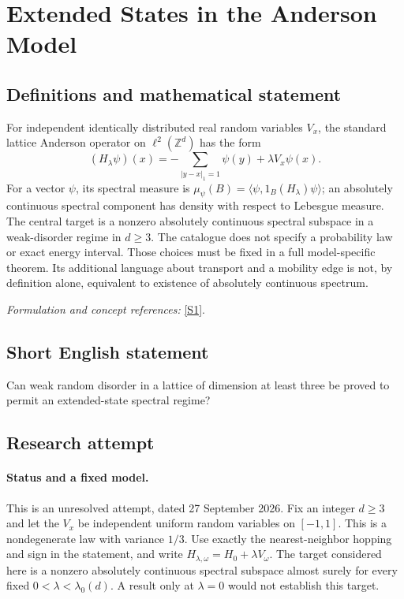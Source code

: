 \documentclass[11pt]{article}
\begin{document}
\section*{\texorpdfstring{Extended States in the Anderson Model}{Extended States in the Anderson Model}}\label{7900001}
\subsection{Definitions and mathematical statement}
For independent identically distributed real random variables $V_x$, the standard lattice Anderson operator on $\ell^2({\mathbb{Z}}^d)$ has the form
\[
 (H_\lambda\psi)(x)=-\sum_{|y-x|_1=1}\psi(y)+\lambda V_x\psi(x).
\]
For a vector $\psi$, its spectral measure is $\mu_\psi(B)=\langle\psi,1_B(H_\lambda)\psi\rangle$; an absolutely continuous spectral component has density with respect to Lebesgue measure. The central target is a nonzero absolutely continuous spectral subspace in a weak-disorder regime in $d\ge3$. The catalogue does not specify a probability law or exact energy interval. Those choices must be fixed in a full model-specific theorem. Its additional language about transport and a mobility edge is not, by definition alone, equivalent to existence of absolutely continuous spectrum.
\par\smallskip\textit{Formulation and concept references:} \href{https://arxiv.org/abs/0709.3707}{[S1]}.

\subsection{Short English statement}
Can weak random disorder in a lattice of dimension at least three be proved to permit an extended-state spectral regime?
\subsection{Research attempt}
\paragraph{Status and a fixed model.}
This is an unresolved attempt, dated 27 September 2026. Fix an integer
$d\geq3$ and let the $V_x$ be independent uniform random variables on
$[-1,1]$. This is a nondegenerate law with variance $1/3$. Use exactly the
nearest-neighbor hopping and sign in the statement, and write
$H_{\lambda,\omega}=H_0+\lambda V_\omega$. The target considered here is a
nonzero absolutely continuous spectral subspace almost surely for every
fixed $0<\lambda<\lambda_0(d)$. A result only at $\lambda=0$ would not
establish this target.
\end{document}
